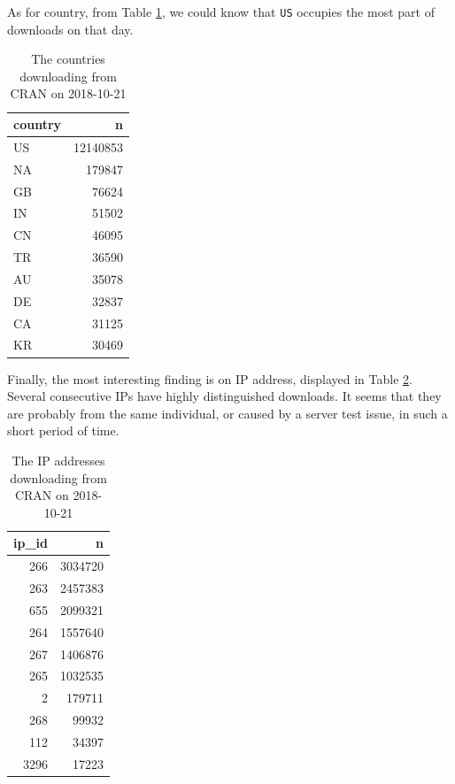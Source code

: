 \documentclass[
]{book}
\begin{document}
As for country, from Table \ref{tab:spike18country}, we could know that \texttt{US} occupies the most part of downloads on that day.

\begin{table}

\caption{\label{tab:spike18country}The countries downloading from CRAN on 2018-10-21}
\centering
\begin{tabular}[t]{l|r}
\hline
country & n\\
\hline
US & 12140853\\
\hline
NA & 179847\\
\hline
GB & 76624\\
\hline
IN & 51502\\
\hline
CN & 46095\\
\hline
TR & 36590\\
\hline
AU & 35078\\
\hline
DE & 32837\\
\hline
CA & 31125\\
\hline
KR & 30469\\
\hline
\end{tabular}
\end{table}

Finally, the most interesting finding is on IP address, displayed in Table \ref{tab:spike18ip}. Several consecutive IPs have highly distinguished downloads. It seems that they are probably from the same individual, or caused by a server test issue, in such a short period of time.

\begin{table}

\caption{\label{tab:spike18ip}The IP addresses downloading from CRAN on 2018-10-21}
\centering
\begin{tabular}[t]{r|r}
\hline
ip\_id & n\\
\hline
266 & 3034720\\
\hline
263 & 2457383\\
\hline
655 & 2099321\\
\hline
264 & 1557640\\
\hline
267 & 1406876\\
\hline
265 & 1032535\\
\hline
2 & 179711\\
\hline
268 & 99932\\
\hline
112 & 34397\\
\hline
3296 & 17223\\
\hline
\end{tabular}
\end{table}
\end{document}
